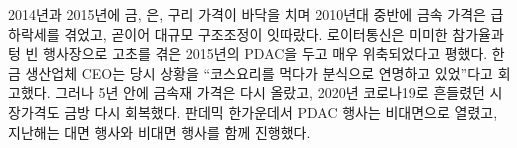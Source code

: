 \documentclass{translation}
\begin{document}

2014년과 2015년에 금, 은, 구리 가격이 바닥을 치며 2010년대 중반에 금속 가격은 급하락세를 겪었고,
곧이어 대규모 구조조정이 잇따랐다.
로이터통신은 미미한 참가율과 텅 빈 행사장으로 고초를 겪은 2015년의 PDAC을 두고 매우 위축되었다고 평했다.
한 금 생산업체 CEO는 당시 상황을 ``코스요리를 먹다가 분식으로 연명하고 있었''다고 회고했다.
그러나 5년 안에 금속재 가격은 다시 올랐고, 2020년 코로나19로 흔들렸던 시장가격도 금방 다시 회복했다.
판데믹 한가운데서 PDAC 행사는 비대면으로 열렸고, 지난해는 대면 행사와 비대면 행사를 함께 진행했다.
\end{document}

